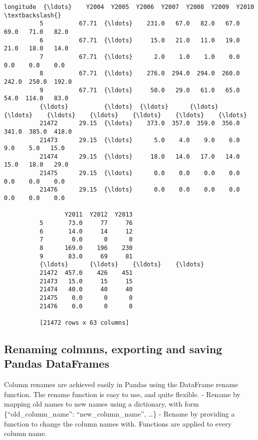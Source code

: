\documentclass[11pt]{article}
\begin{document}
\begin{Verbatim}[commandchars=\\\{\}]
                 longitude  {\ldots}    Y2004  Y2005  Y2006  Y2007  Y2008  Y2009  Y2010  \textbackslash{}
          5          67.71  {\ldots}    231.0   67.0   82.0   67.0   69.0   71.0   82.0   
          6          67.71  {\ldots}     15.0   21.0   11.0   19.0   21.0   18.0   14.0   
          7          67.71  {\ldots}      2.0    1.0    1.0    0.0    0.0    0.0    0.0   
          8          67.71  {\ldots}    276.0  294.0  294.0  260.0  242.0  250.0  192.0   
          9          67.71  {\ldots}     50.0   29.0   61.0   65.0   54.0  114.0   83.0   
          {\ldots}          {\ldots}  {\ldots}      {\ldots}    {\ldots}    {\ldots}    {\ldots}    {\ldots}    {\ldots}    {\ldots}   
          21472      29.15  {\ldots}    373.0  357.0  359.0  356.0  341.0  385.0  418.0   
          21473      29.15  {\ldots}      5.0    4.0    9.0    6.0    9.0    5.0   15.0   
          21474      29.15  {\ldots}     18.0   14.0   17.0   14.0   15.0   18.0   29.0   
          21475      29.15  {\ldots}      0.0    0.0    0.0    0.0    0.0    0.0    0.0   
          21476      29.15  {\ldots}      0.0    0.0    0.0    0.0    0.0    0.0    0.0   
          
                 Y2011  Y2012  Y2013  
          5       73.0     77     76  
          6       14.0     14     12  
          7        0.0      0      0  
          8      169.0    196    230  
          9       83.0     69     81  
          {\ldots}      {\ldots}    {\ldots}    {\ldots}  
          21472  457.0    426    451  
          21473   15.0     15     15  
          21474   40.0     40     40  
          21475    0.0      0      0  
          21476    0.0      0      0  
          
          [21472 rows x 63 columns]
\end{Verbatim}
            
    \subsection{Renaming colmnns, exporting and saving Pandas
DataFrames}\label{renaming-colmnns-exporting-and-saving-pandas-dataframes}

Column renames are achieved easily in Pandas using the DataFrame rename
function. The rename function is easy to use, and quite flexible. -
Rename by mapping old names to new names using a dictionary, with form
\{``old\_column\_name'': ``new\_column\_name'', \ldots{}\} - Rename by
providing a function to change the column names with. Functions are
applied to every column name.
\end{document}
